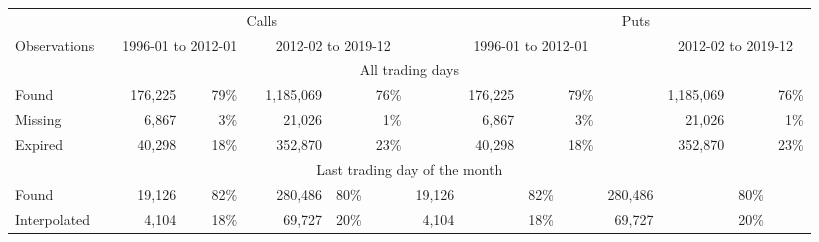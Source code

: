 

		\begin{tabular}{*{2}{l} *{15}{r} }
		       
		        
		         \multicolumn{2}{c}{}  & \multicolumn{7}{c}{Calls}  &  \multicolumn{1}{c}{} & 
		         \multicolumn{7}{c}{Puts} \\
		         
		          
		         \cline{3-9}
		         \cline{11-17}
		       
		         
		          \multicolumn{1}{l}{Observations} &  \multicolumn{1}{l}{} &
		          \multicolumn{3}{c}{1996-01 to 2012-01} & 
		          \multicolumn{1}{c}{} &
			\multicolumn{3}{c}{2012-02 to 2019-12} & 
			\multicolumn{1}{c}{} &
		          \multicolumn{3}{c}{1996-01 to 2012-01} & 
		          \multicolumn{1}{c}{} &
			\multicolumn{3}{c}{2012-02 to 2019-12} \\
		        

		       \hline
		       
		       \multicolumn{17}{c}{All trading days} \\ 
		       
		       \hline 

	
		Found &   & 
		176,225 &  & 79\% & 
		 & 
		 1,185,069 &  &76\% & 
		 & 
		 176,225 &  & 79\% & 
		 & 
		 1,185,069& &76\% 
		 \\

		
		Missing &   & 
		6,867 &  & 3\% & 
		 & 
		 21,026 &  &1\% & 
		 & 
		 6,867 &  & 3\% & 
		 & 
		 21,026& &1\% 
		 \\

		
		Expired &   & 
		40,298 &  & 18\% & 
		 & 
		 352,870 &  &23\% & 
		 & 
		 40,298 &  & 18\% & 
		 & 
		 352,870& &23\% 
		 \\

		
        \hline
        
         \multicolumn{17}{c}{Last trading day of the month} \\

	
		Found &   & 
		19,126 &  & 82\% & 
		 & 
		 280,486 & 80\% & 
		 & 
		 19,126 &  & 82\% & 
		 & 
		 280,486& &80\% 
		 \\

		
		Interpolated &   & 
		4,104 &  & 18\% & 
		 & 
		 69,727 & 20\% & 
		 & 
		 4,104 &  & 18\% & 
		 & 
		 69,727& &20\% 
		 \\

		

	        \hline
	    \end{tabular}
	